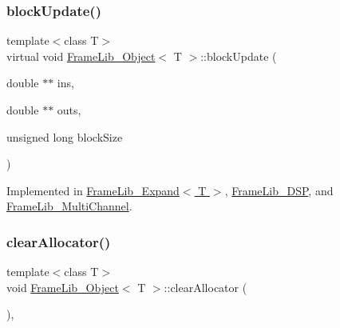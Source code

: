 \mbox{\label{class_frame_lib___object_a6efd81ab386e62400960471fa3cc94e7}} 
\subsubsection{\texorpdfstring{block\+Update()}{blockUpdate()}}
{\footnotesize\ttfamily template$<$class T$>$ \\
virtual void \hyperlink{class_frame_lib___object}{Frame\+Lib\+\_\+\+Object}$<$ T $>$\+::block\+Update (\begin{DoxyParamCaption}\item[{double $\ast$$\ast$}]{ins,  }\item[{double $\ast$$\ast$}]{outs,  }\item[{unsigned long}]{block\+Size }\end{DoxyParamCaption})\hspace{0.3cm}{\ttfamily [pure virtual]}}



Implemented in \hyperlink{class_frame_lib___expand_ae712d631cb99284e91c3f318534b3c03}{Frame\+Lib\+\_\+\+Expand$<$ T $>$}, \hyperlink{class_frame_lib___d_s_p_aafa57c93417ced3d5610ca9f6b0f0913}{Frame\+Lib\+\_\+\+D\+SP}, and \hyperlink{class_frame_lib___multi_channel_a8ad8f1c0138f32ef0bfb7e4673b34d30}{Frame\+Lib\+\_\+\+Multi\+Channel}.

\mbox{\label{class_frame_lib___object_a33b99de2c7a35227bc8a40d4c3b2ee76}} 
\subsubsection{\texorpdfstring{clear\+Allocator()}{clearAllocator()}}
{\footnotesize\ttfamily template$<$class T$>$ \\
void \hyperlink{class_frame_lib___object}{Frame\+Lib\+\_\+\+Object}$<$ T $>$\+::clear\+Allocator (\begin{DoxyParamCaption}{ }\end{DoxyParamCaption})\hspace{0.3cm}{\ttfamily [inline]}, {\ttfamily [protected]}}

